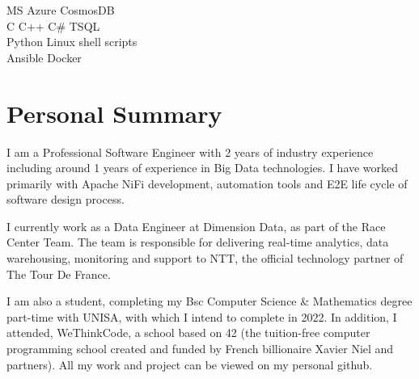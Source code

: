 \documentclass[]{deedy-resume-openfont}
\begin{document}
\begin{minipage}[t]{0.33\textwidth}
MS Azure \textbullet{} CosmosDB \\

C \textbullet{} C++ \textbullet{} C\# \textbullet{}  TSQL \\

Python \textbullet{} Linux shell scripts \\


Ansible \textbullet{} Docker \\
\sectionsep



%
%

\end{minipage} 
\hfill
\begin{minipage}[t]{0.66\textwidth} 



\section{Personal Summary}

I am a Professional Software Engineer with 2 years of industry experience including around 1 years of experience in Big Data technologies. I have worked primarily with  Apache NiFi development, automation tools and E2E life cycle of software design process.
\sectionsep

I currently work as a Data Engineer at Dimension Data, as part of the Race Center Team. The team is
responsible for delivering real-time analytics, data warehousing,  monitoring and support to NTT, the official technology partner of The Tour De France. 

\sectionsep
I am also a student, completing my Bsc Computer Science \& Mathematics degree part-time with UNISA, with which I intend to complete in 2022. In addition, I attended, WeThinkCode, a school based on  42 (the tuition-free computer programming school created and funded by French billionaire Xavier Niel and partners). All my work and project can be viewed on my personal github.  
\sectionsep





\end{minipage}
\end{document}

